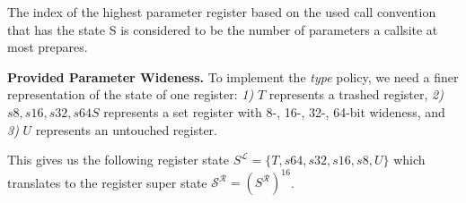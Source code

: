 %
%
%

The index of the highest parameter register based on the used call convention that has the state S is considered to be the number of parameters a callsite at most prepares.

\textbf{Provided Parameter Wideness.}
\label{subsection:providedparamwideness}
To implement the \emph{type} policy, we need a finer representation of the state of one register:
\textit{1)} $T$ represents a trashed register,
\textit{2)} $s8, s16, s32, s64 S$ represents a set register with  8-, 16-, 32-, 64-bit  wideness, and
\textit{3)} $U$ represents an untouched register.

This gives us the following register state $S^\mathcal{L} = \{ T, s64, s32, s16, s8, U \}$ which translates to the register 
super state $\mathcal{S}^\mathcal{R} = (S^\mathcal{R})^{16}$.

